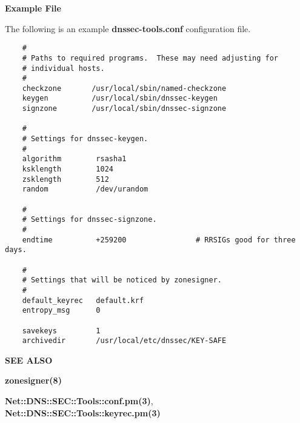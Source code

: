 {\bf Example File}

The following is an example {\bf dnssec-tools.conf} configuration file.

\begin{verbatim}
    #
    # Paths to required programs.  These may need adjusting for
    # individual hosts.
    #
    checkzone       /usr/local/sbin/named-checkzone
    keygen          /usr/local/sbin/dnssec-keygen
    signzone        /usr/local/sbin/dnssec-signzone

    #
    # Settings for dnssec-keygen.
    #
    algorithm        rsasha1
    ksklength        1024
    zsklength        512
    random           /dev/urandom

    #
    # Settings for dnssec-signzone.
    #
    endtime          +259200                # RRSIGs good for three days.

    #
    # Settings that will be noticed by zonesigner.
    #
    default_keyrec   default.krf
    entropy_msg      0

    savekeys         1
    archivedir       /usr/local/etc/dnssec/KEY-SAFE
\end{verbatim}

{\bf SEE ALSO}

{\bf zonesigner(8)}

{\bf Net::DNS::SEC::Tools::conf.pm(3)},
{\bf Net::DNS::SEC::Tools::keyrec.pm(3)}

